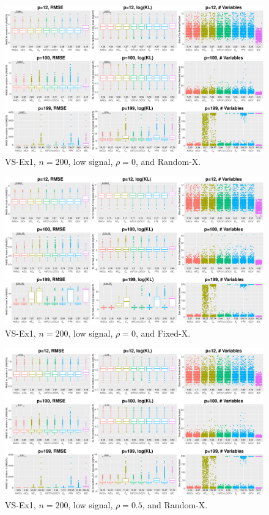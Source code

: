 \clearpage
\begin{figure}[!ht]
\centering
\includegraphics[width=\textwidth]{figures/supplement/randomx_VS-Ex1_n200_lsnr_rho0.eps}
\caption{VS-Ex1, $n=200$, low signal, $\rho=0$, and Random-X.}
\end{figure}
\begin{figure}[!ht]
\centering
\includegraphics[width=\textwidth]{figures/supplement/fixedx_VS-Ex1_n200_lsnr_rho0.eps}
\caption{VS-Ex1, $n=200$, low signal, $\rho=0$, and Fixed-X.}
\end{figure}
\clearpage
\begin{figure}[!ht]
\centering
\includegraphics[width=\textwidth]{figures/supplement/randomx_VS-Ex1_n200_lsnr_rho05.eps}
\caption{VS-Ex1, $n=200$, low signal, $\rho=0.5$, and Random-X.}
\end{figure}
